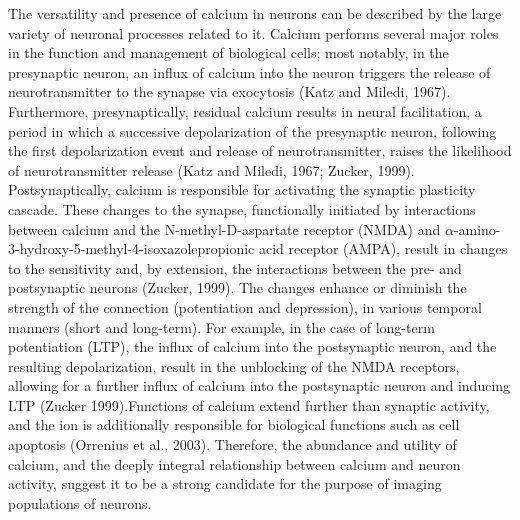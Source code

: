 \documentclass[11pt]{article}
\begin{document}
The versatility and presence of calcium in neurons can be described by the large variety of neuronal processes related to it. Calcium performs several major roles in the function and management of biological cells; most notably, in the presynaptic neuron, an influx of calcium into the neuron triggers the release of neurotransmitter to the synapse via exocytosis (Katz and Miledi, 1967). Furthermore, presynaptically, residual calcium results in neural facilitation, a period in which a successive depolarization of the presynaptic neuron, following the first depolarization event and release of neurotransmitter, raises the likelihood of neurotransmitter release (Katz and Miledi, 1967; Zucker, 1999). Postsynaptically, calcium is responsible for activating the synaptic plasticity cascade. These changes to the synapse, functionally initiated by interactions between calcium and the N-methyl-D-aspartate receptor (NMDA) and $\alpha$-amino-3-hydroxy-5-methyl-4-isoxazolepropionic acid receptor (AMPA), result in changes to the sensitivity and, by extension, the interactions between the pre- and postsynaptic neurons (Zucker, 1999). The changes enhance or diminish the strength of the connection (potentiation and depression), in various temporal manners (short and long-term). For example, in the case of long-term potentiation (LTP), the influx of calcium into the postsynaptic neuron, and the resulting depolarization, result in the unblocking of the NMDA receptors, allowing for a further influx of calcium into the postsynaptic neuron and inducing LTP (Zucker 1999).Functions of calcium extend further than synaptic activity, and the ion is additionally responsible for biological functions such as cell apoptosis (Orrenius et al., 2003). Therefore, the abundance and utility of calcium, and the deeply integral relationship between calcium and neuron activity, suggest it to be a strong candidate for the purpose of imaging populations of neurons.\par
\end{document}
